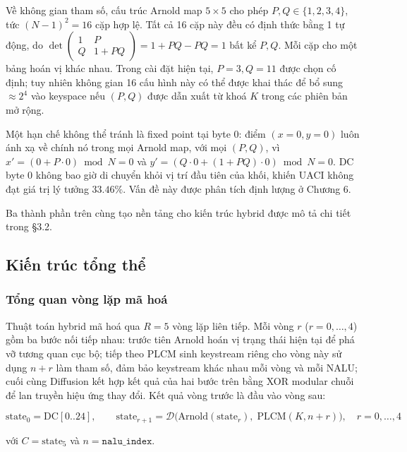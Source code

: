 Về không gian tham số, cấu trúc Arnold map $5\times5$ cho phép $P, Q \in \{1, 2, 3, 4\}$, tức $(N-1)^2 = 16$ cặp hợp lệ. Tất cả 16 cặp này đều có định thức bằng 1 tự động, do $\det\!\begin{pmatrix}1 & P \\ Q & 1{+}PQ\end{pmatrix} = 1 + PQ - PQ = 1$ bất kể $P, Q$. Mỗi cặp cho một bảng hoán vị khác nhau. Trong cài đặt hiện tại, $P=3, Q=11$ được chọn cố định; tuy nhiên không gian 16 cấu hình này có thể được khai thác để bổ sung $\approx 2^4$ vào keyspace nếu $(P, Q)$ được dẫn xuất từ khoá $K$ trong các phiên bản mở rộng.

Một hạn chế không thể tránh là fixed point tại byte 0: điểm $(x=0, y=0)$ luôn ánh xạ về chính nó trong mọi Arnold map, với mọi $(P, Q)$, vì $x' = (0 + P\cdot0) \bmod N = 0$ và $y' = (Q\cdot0 + (1+PQ)\cdot0) \bmod N = 0$. DC byte 0 không bao giờ di chuyển khỏi vị trí đầu tiên của khối, khiến UACI không đạt giá trị lý tưởng $33.46\%$. Vấn đề này được phân tích định lượng ở Chương 6.

Ba thành phần trên cùng tạo nền tảng cho kiến trúc hybrid được mô tả chi tiết trong §3.2.

\subsection{Kiến trúc tổng thể}

\subsubsection{Tổng quan vòng lặp mã hoá}

Thuật toán hybrid mã hoá qua $R = 5$ vòng lặp liên tiếp. Mỗi vòng $r$ ($r = 0,\ldots,4$) gồm ba bước nối tiếp nhau: trước tiên Arnold hoán vị trạng thái hiện tại để phá vỡ tương quan cục bộ; tiếp theo PLCM sinh keystream riêng cho vòng này sử dụng $n{+}r$ làm tham số, đảm bảo keystream khác nhau mỗi vòng và mỗi NALU; cuối cùng Diffusion kết hợp kết quả của hai bước trên bằng XOR modular chuỗi để lan truyền hiệu ứng thay đổi. Kết quả vòng trước là đầu vào vòng sau:

\begin{equation}
\text{state}_0 = \text{DC}[0..24], \qquad
\text{state}_{r+1} = \mathcal{D}\!\bigl(\text{Arnold}(\text{state}_r),\; \text{PLCM}(K, n{+}r)\bigr), \quad r=0,\ldots,4
\label{eq:5rounds}
\end{equation}

với $C = \text{state}_5$ và $n = \texttt{nalu\_index}$.


